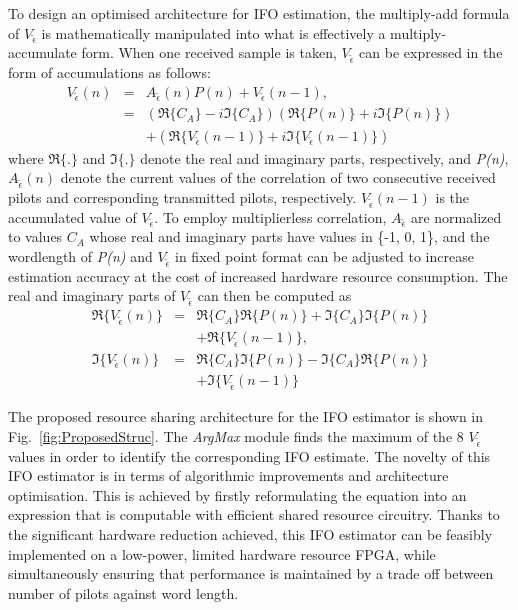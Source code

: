 To design an optimised architecture for IFO estimation, the multiply-add formula of $V_{\tilde{\epsilon}}$ is mathematically manipulated into what is effectively a multiply-accumulate form.
When one received sample is taken, $V_{\tilde{\epsilon}}$ can be expressed in the form of accumulations as follows:
\begin{eqnarray}
\label{complexVi}
V_{\tilde{\epsilon}}(n)	&=&   A_{\tilde{\epsilon}}(n) P(n)  + V_{\tilde{\epsilon}}(n-1), \nonumber \\
						&=& (\Re{\{C_A\}} - i \Im{\{C_A\}})  (\Re{\{P(n)\}} + i \Im{\{P(n)\}}) \nonumber \\
	 					&  &+ (\Re{\{V_{\tilde{\epsilon}}(n-1)\}}+i \Im{\{V_{\tilde{\epsilon}}(n-1)\}})
\end{eqnarray}
where $\Re{\{.\}}$ and $\Im{\{.\}}$ denote the real and imaginary parts, respectively, and \emph{P(n)}, $A_{\tilde{\epsilon}}(n)$ denote the current values of the correlation of two consecutive received pilots and corresponding transmitted pilots, respectively.
$V_{\tilde{\epsilon}}(n-1)$ is the accumulated value of $V_{\tilde{\epsilon}}$.
To employ multiplierless correlation, $A_{\tilde{\epsilon}}$ are normalized to values $C_A$ whose real and imaginary parts have values in \{-1, 0, 1\}, and the wordlength of \emph{P(n)} and $V_{\tilde{\epsilon}}$ in fixed point format can be adjusted to increase estimation accuracy at the cost of increased hardware resource consumption.
The real and imaginary parts of $V_{\tilde{\epsilon}}$ can then be computed as
\begin{eqnarray}
\label{realimaginaryVi}
\Re{\{V_{\tilde{\epsilon}}(n)\}} &=& \Re{\{C_A\}} \Re{\{ P(n)\}}+\Im{\{C_A\}} \Im{\{ P(n)\}} \nonumber \\
								& &+ \Re{\{V_{\tilde{\epsilon}}(n-1)\}} , 					\nonumber \\
\Im{\{V_{\tilde{\epsilon}}(n)\}} &=& \Re{\{C_A\}} \Im{\{ P(n)\}}-\Im{\{C_A\}} \Re{\{ P(n)\}}	\nonumber \\
								& &+ \Im{\{V_{\tilde{\epsilon}}(n-1)\}}
\end{eqnarray}

The proposed resource sharing architecture for the IFO estimator is shown in Fig.~\ref{fig:ProposedStruc}. The \emph{ArgMax} module finds the maximum of the 8 $V_{\tilde{\epsilon}}$ values in order to identify the corresponding IFO estimate.
The novelty of this IFO estimator is in terms of algorithmic improvements and architecture optimisation. This is achieved by firstly reformulating the equation into an expression that is computable with efficient shared resource circuitry.
Thanks to the significant hardware reduction achieved, this IFO estimator can be feasibly implemented on a low-power, limited hardware resource FPGA, while simultaneously ensuring that performance is maintained by a trade off between number of pilots against word length.

